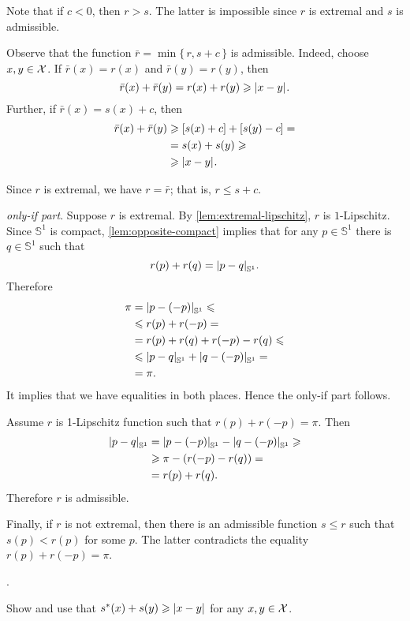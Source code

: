 Note that if $c<0$, then $r>s$.
The latter is impossible since $r$ is extremal and $s$ is admissible.

Observe that the function $\bar r=\min\{\,r,s+c\,\}$ is admissible.
Indeed, choose $x,y\in \mathcal{X}$.
If $\bar r(x)=r(x)$ and $\bar r(y)=r(y)$, then 
\[\bar r(x)+\bar r(y)=r(x)+ r(y)\ge \dist{x}{y}{}.\]
Further, if $\bar r(x)=s(x)+c$, then 
\begin{align*}
\bar r(x)+\bar r(y)&\ge [s(x)+c]+ [s(y)-c]= 
\\
&=s(x)+s(y) \ge 
\\
&\ge\dist{x}{y}{}.
\end{align*}

Since $r$ is extremal, we have $r=\bar r$;
that is, $r\le s+c$.

\parbf{\ref{ex:circle};} \textit{only-if part}.
Suppose $r$ is extremal.
By \ref{lem:extremal-lipschitz}, $r$ is $1$-Lipschitz.
Since $\mathbb{S}^1$ is compact, \ref{lem:opposite-compact} implies that for any $p\in \mathbb{S}^1$ there is $q\in \mathbb{S}^1$ such that 
\[r(p)+r (q) = \dist{p}{q}{\mathbb{S}^1}.\]
Therefore
\begin{align*}
\pi&=\dist{p}{(-p)}{\mathbb{S}^1}\le 
\\
&\le 
r(p)+r(-p)=
\\
&=
r(p)+r(q) +r(-p) -r(q)\le
\\
&\le
\dist{p}{q}{\mathbb{S}^1}+\dist{q}{(-p)}{\mathbb{S}^1}=
\\
&=\pi.
\end{align*}
It implies that we have equalities in both places.
Hence the only-if part follows.

Assume $r$ is 1-Lipschitz function such that $r(p)+r(-p)=\pi$.
Then 
\begin{align*}
\dist pq{\mathbb{S}^1}&=
\dist{p}{(-p)}{\mathbb{S}^1}-\dist{q}{(-p)}{\mathbb{S}^1}\ge
\\
&\ge\pi -(r(-p)-r(q))=
\\
&=r(p)+r(q).
\end{align*}
Therefore $r$ is admissible.

Finally, if $r$ is not extremal, then there is an admissible function $s\le r$ such that $s(p)<r(p)$ for some $p$.
The latter contradicts the equality $r(p)+r(-p)=\pi$.

 \cite[Proposition 2.7]{zuest}.

Show and use that
$s^*(x)+s(y)\ge \dist{x}{y}{}$
for any $x,y\in \mathcal{X}$.

